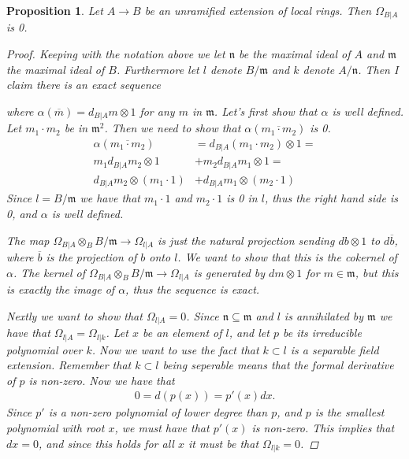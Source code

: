 \documentclass[11pt, a4paper, english]{article}
\newtheorem{prop}{Proposition}
\numberwithin{prop}{section}
\numberwithin{lemma}{section}
\numberwithin{theorem}{section}
\numberwithin{defin}{section}
\numberwithin{example}{section}
\begin{document}
\begin{prop}
Let $A \to B$ be an unramified extension of local rings. Then $\Omega_{B|A}$ is 0.

\begin{proof}
Keeping with the notation above we let $\mathfrak{n}$ be the maximal ideal of $A$ and $\mathfrak{m}$ the maximal ideal of $B$. Furthermore let $l$ denote $B/\mathfrak{m}$ and $k$ denote $A/\mathfrak{n}$. Then I claim there is an exact sequence
\begin{center}
\end{center}
where $\alpha(\overline{m}) = d_{B|A}m \otimes 1$ for any $m$ in $\mathfrak{m}$. Let's first show that $\alpha$ is well defined. Let $m_1 \cdot m_2$ be in $\mathfrak{m}^2$. Then we need to show that $\alpha(\overline{m_1 \cdot m_2})$ is 0. 
\begin{align*}
\alpha(\overline{m_1 \cdot m_2}) &= d_{B|A}(m_1 \cdot m_2) \otimes 1 =\\ 
m_1 d_{B|A}m_2 \otimes 1 &+ m_2d_{B|A}m_1 \otimes 1 =\\ 
d_{B|A}m_2 \otimes (m_1 \cdot 1) &+ d_{B|A}m_1 \otimes (m_2 \cdot 1)
\end{align*}
Since $l = B/\mathfrak{m}$ we have that $m_1 \cdot 1$ and $m_2 \cdot 1$ is 0 in $l$, thus the right hand side is 0, and $\alpha$ is well defined.

The map $\Omega_{B|A} \otimes_B B/\mathfrak{m} \to \Omega_{l|A}$ is just the natural projection sending $db \otimes 1$ to $d\overline{b}$, where $\overline{b}$ is the projection of $b$ onto $l$. We want to show that this is the cokernel of $\alpha$. The kernel of $\Omega_{B|A} \otimes_B B/\mathfrak{m} \to \Omega_{l|A}$ is generated by $dm \otimes 1$ for $m \in \mathfrak{m}$, but this is exactly the image of $\alpha$, thus the sequence is exact.

Nextly we want to show that $\Omega_{l|A} = 0$. Since $\mathfrak{n} \subseteq \mathfrak{m}$ and $l$ is annihilated by $\mathfrak{m}$ we have that $\Omega_{l|A} = \Omega_{l|k}$. Let $x$ be an element of $l$, and let $p$ be its irreducible polynomial over $k$. Now we want to use the fact that $k \subset l$ is a separable field extension. Remember that $k \subset l$ being seperable means that the formal derivative of $p$ is non-zero. Now we have that 
\begin{align*}
0 = d(p(x)) = p'(x)dx.
\end{align*}
Since $p'$ is a non-zero polynomial of lower degree than $p$, and $p$ is the smallest polynomial with root $x$, we must have that $p'(x)$ is non-zero. This implies that $dx=0$, and since this holds for all $x$ it must be that $\Omega_{l|k}=0$.


\end{proof}
\end{prop}
\end{document}

